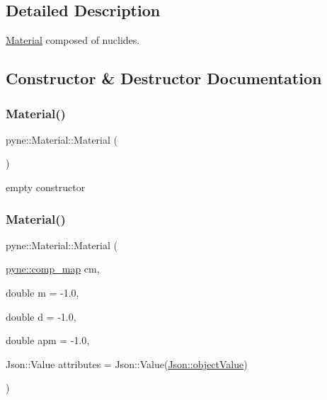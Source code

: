 \subsection{Detailed Description}
\hyperlink{classpyne_1_1_material}{Material} composed of nuclides. 

\subsection{Constructor \& Destructor Documentation}
\mbox{\label{classpyne_1_1_material_af9ff0462388696834a886b2e284ccd4e}} 
\subsubsection{\texorpdfstring{Material()}{Material()}\hspace{0.1cm}{\footnotesize\ttfamily [1/4]}}
{\footnotesize\ttfamily pyne\+::\+Material\+::\+Material (\begin{DoxyParamCaption}{ }\end{DoxyParamCaption})}

empty constructor \mbox{\label{classpyne_1_1_material_a0704a8fc8a7599cb271c349240f37538}} 
\subsubsection{\texorpdfstring{Material()}{Material()}\hspace{0.1cm}{\footnotesize\ttfamily [2/4]}}
{\footnotesize\ttfamily pyne\+::\+Material\+::\+Material (\begin{DoxyParamCaption}\item[{\hyperlink{namespacepyne_a86738cecccf4ce3f4ecc2ff6f45ce1a2}{pyne\+::comp\+\_\+map}}]{cm,  }\item[{double}]{m = {\ttfamily -\/1.0},  }\item[{double}]{d = {\ttfamily -\/1.0},  }\item[{double}]{apm = {\ttfamily -\/1.0},  }\item[{Json\+::\+Value}]{attributes = {\ttfamily Json\+:\+:Value(\hyperlink{namespace_json_a7d654b75c16a57007925868e38212b4eae8386dcfc36d1ae897745f7b4f77a1f6}{Json\+::object\+Value})} }\end{DoxyParamCaption})}

